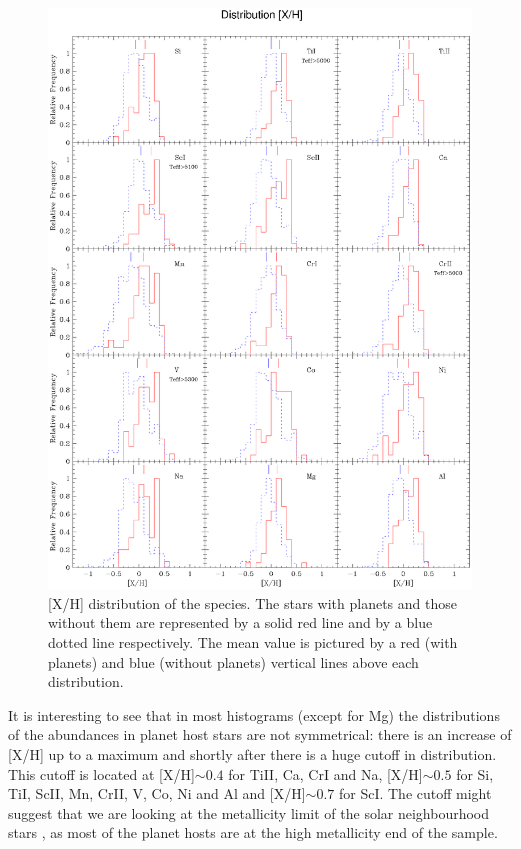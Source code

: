 \documentclass[dvips,12pt,a4paper]{report}
\begin{document}
{{\begin{figure}[h!]
\centering
\includegraphics[trim=0cm 1.5cm 0cm 1cm,clip,width=16 cm]{pics/parte4/histxhfinal.eps}
\caption[depois]{[X/H] distribution of the species. The stars with planets and those without them are represented by a solid red line and by a blue dotted line respectively. The mean value is pictured by a red (with planets) and blue (without planets) vertical lines above each distribution.}
\label{gfxdistro}
\end{figure}





It is interesting to see that in most histograms (except for Mg) the distributions of the abundances in planet host stars are not symmetrical: there is an increase of [X/H] up to a maximum and shortly after there is a huge cutoff in distribution. This cutoff is located at [X/H]$\sim0.4$ for TiII, Ca, CrI and Na, [X/H]$\sim0.5$ for Si, TiI, ScII, Mn, CrII, V, Co, Ni and Al and [X/H]$\sim0.7$ for ScI. The cutoff might suggest that we are looking at the metallicity limit of the solar neighbourhood stars \citep[e.g.][]{Santos-2003}, as most of the planet hosts are at the high metallicity end of the sample.

}}
\end{document}
